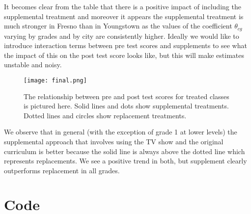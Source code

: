 \documentclass{article}
\begin{document}
It becomes clear from the table that there is a positive impact of including the supplemental treatment and moreover it appears the supplemental treatment is much stronger in Fresno than in Youngstown as the values of the coefficient $\theta_{cg}$ varying by grades and by city are consistently higher. Ideally we would like to introduce interaction terms between pre test scores and supplements to see what the impact of this on the post test score looks like, but this will make estimates unstable and noisy.
\begin{figure}[H]
\centering
\texttt{[image: final.png]}
\caption{The relationship between pre and post test scores for treated classes is pictured here. Solid lines and dots show supplemental treatments. Dotted lines and circles show replacement treatments.}
\label{deltat}
\end{figure}
We observe that in general (with the exception of grade 1 at lower levels) the supplemental approach that involves using the TV show and the original curriculum is better because the solid line is always above the dotted line which represents replacements. We see a positive trend in both, but supplement clearly outperforms replacement in all grades.

\section{Code}
\end{document}
